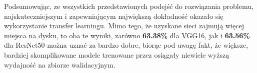 Podsumowując, ze wszystkich przedstawionych podejść do rozwiązania problemu, najskuteczniejszym i zapewniającym największą dokładność okazało się wykorzystanie transfer learningu. Mimo tego, że uzyskane sieci zajmują więcej miejsca na dysku, to oba te wyniki, zarówno \textbf{63.38\%} dla VGG16, jak i \textbf{63.56\%} dla ResNet50 można uznać za bardzo dobre, biorąc pod uwagę fakt, że większe, bardziej skomplikowane modele trenowane przez \cite{GAD} osiągały niewiele wyższą wydajność na zbiorze walidacyjnym. 
